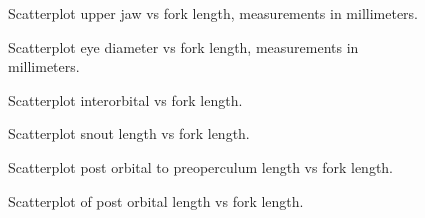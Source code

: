 \documentclass[12pt]{article}\usepackage[]{graphicx}\usepackage[]{color}
\begin{document}
\begin{figure}[htb]

{\centering {} 

}

\caption{Scatterplot upper jaw vs fork length, measurements in millimeters.}\label{fig:figure3}
\end{figure}

\begin{figure}[htb]

{\centering {} 

}

\caption{Scatterplot eye diameter vs fork length, measurements in millimeters.}\label{fig:figure4}
\end{figure}

\begin{figure}[htb]

{\centering {} 

}

\caption{Scatterplot interorbital vs fork length.}\label{fig:figure5}
\end{figure}

\begin{figure}[htb]

{\centering {} 

}

\caption{Scatterplot snout length vs fork length.}\label{fig:figure6}
\end{figure}

\begin{figure}[htb]

{\centering {} 

}

\caption{Scatterplot post orbital to preoperculum length vs fork length.}\label{fig:figure7}
\end{figure}

\begin{figure}[htb]

{\centering {} 

}

\caption{Scatterplot of post orbital length vs fork length.}\label{fig:figure8}
\end{figure}
\clearpage
\end{document}
